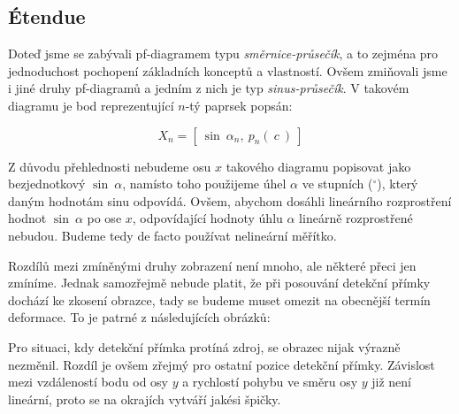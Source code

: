 

\subsection{Étendue}

Doteď jsme se zabývali pf-diagramem typu \emph{směrnice-průsečík}, a to zejména pro jednoduchost pochopení základních konceptů a vlastností. Ovšem zmiňovali jsme i jiné druhy pf-diagramů a jedním z nich je typ \emph{sinus-průsečík}. V takovém diagramu je bod reprezentující $n$-tý paprsek popsán:

\[ X_n = [\ \sin\ \alpha_n,\ p_n(\ c\ )\ ] \]

Z důvodu přehlednosti nebudeme osu $x$ takového diagramu popisovat jako bezjednotkový $\sin\ \alpha$, namísto toho použijeme úhel $\alpha$ ve stupních ($^{\circ}$), který daným hodnotám sinu odpovídá. Ovšem, abychom dosáhli lineárního rozprostření hodnot $\sin\ \alpha$ po ose $x$, odpovídající hodnoty úhlu $\alpha$ lineárně rozprostřené nebudou. Budeme tedy de facto používat nelineární měřítko.

Rozdílů mezi zmíněnými druhy zobrazení není mnoho, ale některé přeci jen zmíníme. Jednak samozřejmě nebude platit, že při posouvání detekční přímky dochází ke zkosení obrazce, tady se budeme muset omezit na obecnější termín deformace. To je patrné z následujících obrázků:


Pro situaci, kdy detekční přímka protíná zdroj, se obrazec nijak výrazně nezměnil. Rozdíl je ovšem zřejmý pro ostatní pozice detekční přímky. Závislost mezi vzdáleností bodu od osy $y$ a rychlostí pohybu ve směru osy $y$ již není lineární, proto se na okrajích vytváří jakési špičky.

